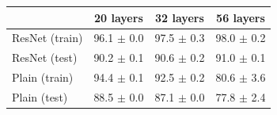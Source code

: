 \begin{tabular}{lccc}
\toprule
 & 20 layers & 32 layers & 56 layers \\
\midrule
ResNet (train) & 96.1 $\pm$ 0.0 & 97.5 $\pm$ 0.3 & 98.0 $\pm$ 0.2 \\
ResNet (test) & 90.2 $\pm$ 0.1 & 90.6 $\pm$ 0.2 & 91.0 $\pm$ 0.1 \\
Plain (train) & 94.4 $\pm$ 0.1 & 92.5 $\pm$ 0.2 & 80.6 $\pm$ 3.6 \\
Plain (test) & 88.5 $\pm$ 0.0 & 87.1 $\pm$ 0.0 & 77.8 $\pm$ 2.4 \\
\bottomrule
\end{tabular}
